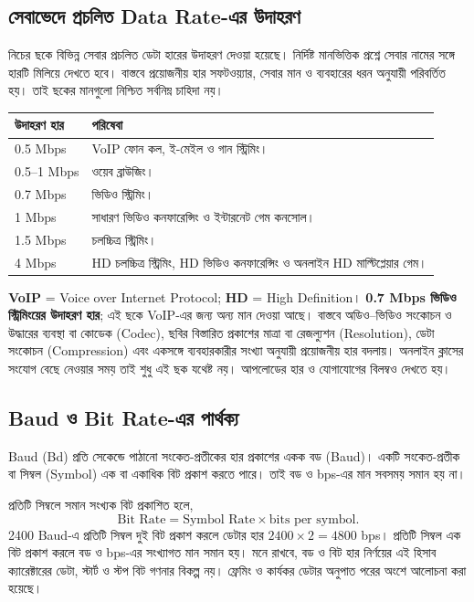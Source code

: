 \subsection{সেবাভেদে প্রচলিত Data Rate-এর উদাহরণ}
\label{ch2:c01-12}
নিচের ছকে বিভিন্ন সেবার প্রচলিত ডেটা হারের উদাহরণ দেওয়া হয়েছে। নির্দিষ্ট মানভিত্তিক প্রশ্নে সেবার নামের সঙ্গে হারটি মিলিয়ে দেখতে হবে। বাস্তবে প্রয়োজনীয় হার সফটওয়্যার, সেবার মান ও ব্যবহারের ধরন অনুযায়ী পরিবর্তিত হয়। তাই ছকের মানগুলো নিশ্চিত সর্বনিম্ন চাহিদা নয়।
\begin{tabularx}{\linewidth}{|p{.25\linewidth}|X|}
\hline
\textbf{উদাহরণ হার} & \textbf{পরিষেবা}\\\hline
0.5 Mbps & VoIP ফোন কল, ই-মেইল ও গান স্ট্রিমিং।\\\hline
0.5--1 Mbps & ওয়েব ব্রাউজিং।\\\hline
0.7 Mbps & ভিডিও স্ট্রিমিং।\\\hline
1 Mbps & সাধারণ ভিডিও কনফারেন্সিং ও ইন্টারনেট গেম কনসোল।\\\hline
1.5 Mbps & চলচ্চিত্র স্ট্রিমিং।\\\hline
4 Mbps & HD চলচ্চিত্র স্ট্রিমিং, HD ভিডিও কনফারেন্সিং ও অনলাইন HD মাল্টিপ্লেয়ার গেম।\\\hline
\end{tabularx}
\textbf{VoIP} = Voice over Internet Protocol; \textbf{HD} = High Definition। \textbf{0.7 Mbps ভিডিও স্ট্রিমিংয়ের উদাহরণ হার}; এই ছকে VoIP-এর জন্য অন্য মান দেওয়া আছে। বাস্তবে অডিও–ভিডিও সংকোচন ও উদ্ধারের ব্যবস্থা বা কোডেক (Codec), ছবির বিস্তারিত প্রকাশের মাত্রা বা রেজল্যুশন (Resolution), ডেটা সংকোচন (Compression) এবং একসঙ্গে ব্যবহারকারীর সংখ্যা অনুযায়ী প্রয়োজনীয় হার বদলায়। অনলাইন ক্লাসের সংযোগ বেছে নেওয়ার সময় তাই শুধু এই ছক যথেষ্ট নয়। আপলোডের হার ও যোগাযোগের বিলম্বও দেখতে হয়।

\subsection{Baud ও Bit Rate-এর পার্থক্য}
\label{ch2:c01-13}
\begin{definitionbox}{Baud (Bd)}
প্রতি সেকেন্ডে পাঠানো সংকেত-প্রতীকের হার প্রকাশের একক বড (Baud)। একটি সংকেত-প্রতীক বা সিম্বল (Symbol) এক বা একাধিক বিট প্রকাশ করতে পারে। তাই বড ও bps-এর মান সবসময় সমান হয় না।
\end{definitionbox}
প্রতিটি সিম্বলে সমান সংখ্যক বিট প্রকাশিত হলে,
\[
\text{Bit Rate}=\text{Symbol Rate}\times\text{bits per symbol}.
\]
2400 Baud-এ প্রতিটি সিম্বল দুই বিট প্রকাশ করলে ডেটার হার $2400\times2=4800$ bps। প্রতিটি সিম্বল এক বিট প্রকাশ করলে বড ও bps-এর সংখ্যাগত মান সমান হয়। মনে রাখবে, বড ও বিট হার নির্ণয়ের এই হিসাব ক্যারেক্টারের ডেটা, স্টার্ট ও স্টপ বিট গণনার বিকল্প নয়। ফ্রেমিং ও কার্যকর ডেটার অনুপাত পরের অংশে আলোচনা করা হয়েছে।
